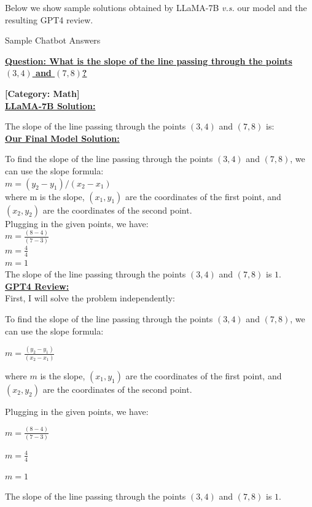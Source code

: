 \clearpage

Below we show sample solutions obtained by LLaMA-7B \textit{v.s.} our model and the resulting GPT4 review.

\begin{AIBox}{Sample Chatbot Answers}
	\parbox[t]{\textwidth}{{\bf \underline{Question: What is the slope of the line passing through the points $(3, 4)$ and $(7, 8)$?}}}

	\textbf{[Category: Math]}\\

	\textbf{\underline{LLaMA-7B Solution:}}

	The slope of the line passing through the points $(3, 4)$ and $(7, 8)$ is:\\

	\textbf{\underline{Our Final Model Solution:}}

	To find the slope of the line passing through the points $(3, 4)$ and $(7, 8)$, we can use the slope formula:\\ $m = (y_2 - y_1) / (x_2 - x_1)$\\ where m is the slope, $(x_1, y_1)$ are the coordinates of the first point, and $(x_2, y_2)$ are the coordinates of the second point.\\ Plugging in the given points, we have:\\ $m = \frac{(8 - 4)}{(7 - 3)}$\\ $m = \frac{4}{4}$\\ $m = 1$\\ The slope of the line passing through the points $(3, 4)$ and $(7, 8)$ is $1$.\\

	\textbf{\underline{GPT4 Review:}}\\
	First, I will solve the problem independently:

	To find the slope of the line passing through the points $(3, 4)$ and $(7, 8)$, we can use the slope formula:

	$m = \frac{(y_2 - y_1)}{(x_2 - x_1)}$

	where $m$ is the slope, $(x_1, y_1)$ are the coordinates of the first point, and $(x_2, y_2)$ are the coordinates of the second point.

	Plugging in the given points, we have:

	$m = \frac{(8 - 4)}{(7 - 3)}$

	$m = \frac{4}{4}$

	$m = 1$

	The slope of the line passing through the points $(3, 4)$ and $(7, 8)$ is $1$.\\


\end{AIBox}

